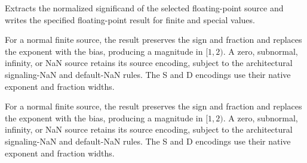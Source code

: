 Extracts the normalized significand of the selected floating-point source and writes the specified floating-point result for finite and special values.

For a normal finite source, the result preserves the sign and fraction and replaces the exponent with the bias,
producing a magnitude in \([1,2)\). A zero, subnormal, infinity, or NaN source retains its source encoding, subject
to the architectural signaling-NaN and default-NaN rules. The S and D encodings use their native exponent and fraction
widths.

For a normal finite source, the result preserves the sign and fraction and replaces the exponent with the bias,
producing a magnitude in \([1,2)\). A zero, subnormal, infinity, or NaN source retains its source encoding, subject
to the architectural signaling-NaN and default-NaN rules. The S and D encodings use their native exponent and fraction
widths.
